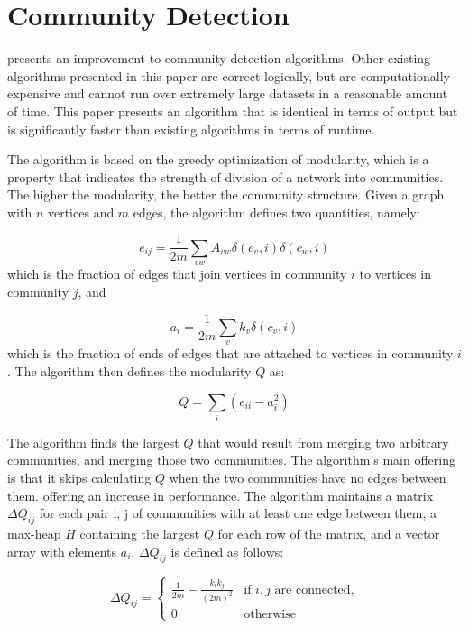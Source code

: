 \section{Community Detection}
\label{sec:commdet}

 presents an improvement to community detection algorithms. Other existing algorithms presented in this paper are correct logically, but are computationally expensive and cannot run over extremely large datasets in a reasonable amount of time. This paper presents an algorithm that is identical in terms of output but is significantly faster than existing algorithms in terms of runtime.

The algorithm is based on the greedy optimization of modularity, which is a property that indicates the strength of division of a network into communities. The higher the modularity, the better the community structure. Given a graph with $n$ vertices and $m$ edges, the algorithm defines two quantities, namely:

\begin{equation}
e_{ij} = \frac{1}{2m} \sum_{vw}{A_{vw}\delta(c_v,i)\delta(c_w,i)}
\end{equation}which is the fraction of edges that join vertices in community $i$ to vertices in community $j$, and

\begin{equation}
a_i = \frac{1}{2m} \sum_{v}{k_v\delta(c_v,i)}
\end{equation}which is the fraction of ends of edges that are attached to vertices in community $i$. The algorithm then defines the modularity $Q$ as:

\begin{equation}
Q = \sum_{i}({e_{ii}-a_i^2})
\end{equation}

The algorithm finds the largest $Q$ that would result from merging two arbitrary communities, and merging those two communities. The algorithm's main offering is that it skips calculating $Q$ when the two communities have no edges between them. offering an increase in performance. The algorithm maintains a matrix $\Delta Q_{ij}$ for each pair i, j of communities with at least one edge between them, a max-heap $H$ containing the largest $Q$ for each row of the matrix, and a vector array with elements $a_{i}$. $\Delta Q_{ij}$ is defined as follows:

\begin{equation}
\Delta Q_{ij} =
\begin {cases}
\frac{1}{2m}-\frac{k_ik_j}{(2m)^2} &\text{if }i, j\text{ are connected,}
\\ 0 & \text{otherwise}
\end{cases}
\end{equation}

